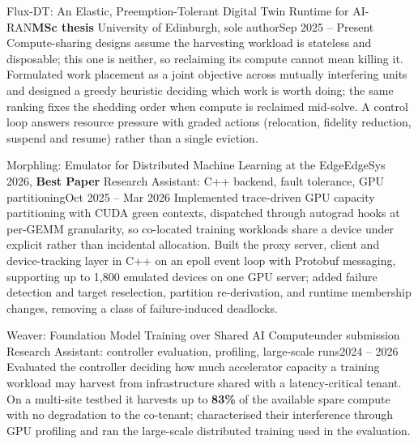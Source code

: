   \resumeSubHeadingListEnd

  \resumeSubHeadingListStart

    \resumeSubheading
      {Flux-DT: An Elastic, Preemption-Tolerant Digital Twin Runtime for AI-RAN}{\textbf{MSc thesis}}
      {University of Edinburgh, sole author}{Sep 2025 -- Present}
      \resumeItemListStart
          {Compute-sharing designs assume the harvesting workload is stateless and disposable; this one is neither, so reclaiming its compute cannot mean killing it. Formulated work placement as a joint objective across mutually interfering units and designed a greedy heuristic deciding which work is worth doing; the same ranking fixes the shedding order when compute is reclaimed mid-solve. A control loop answers resource pressure with graded actions (relocation, fidelity reduction, suspend and resume) rather than a single eviction.}
      \resumeItemListEnd

    \resumeSubheading
      {Morphling: Emulator for Distributed Machine Learning at the Edge}{EdgeSys 2026, \textbf{Best Paper}}
      {Research Assistant: C++ backend, fault tolerance, GPU partitioning}{Oct 2025 -- Mar 2026}
      \resumeItemListStart
          {Implemented trace-driven GPU capacity partitioning with CUDA green contexts, dispatched through autograd hooks at per-GEMM granularity, so co-located training workloads share a device under explicit rather than incidental allocation.}
          {Built the proxy server, client and device-tracking layer in C++ on an epoll event loop with Protobuf messaging, supporting up to 1,800 emulated devices on one GPU server; added failure detection and target reselection, partition re-derivation, and runtime membership changes, removing a class of failure-induced deadlocks.}
      \resumeItemListEnd

    \resumeSubheading
      {Weaver: Foundation Model Training over Shared AI Compute}{under submission}
      {Research Assistant: controller evaluation, profiling, large-scale runs}{2024 -- 2026}
      \resumeItemListStart
          {Evaluated the controller deciding how much accelerator capacity a training workload may harvest from infrastructure shared with a latency-critical tenant. On a multi-site testbed it harvests up to \textbf{83\%} of the available spare compute with no degradation to the co-tenant; characterised their interference through GPU profiling and ran the large-scale distributed training used in the evaluation.}
      \resumeItemListEnd

